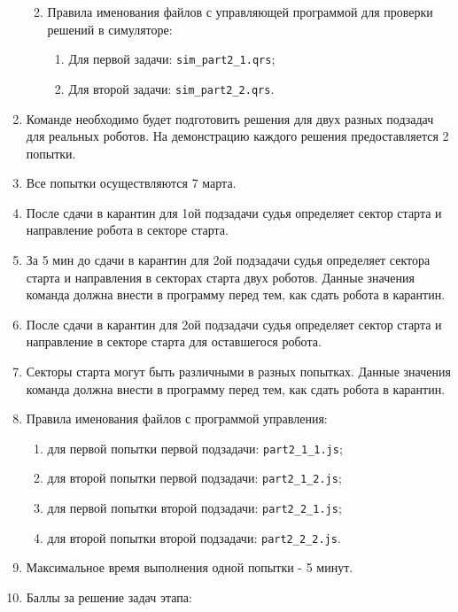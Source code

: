 \begin{enumerate}
\begin{enumerate}
\begin{enumerate}
        \end{enumerate}

        \item Правила именования файлов с управляющей программой для проверки решений в симуляторе:
        \begin{enumerate}
            \item Для первой задачи: \texttt{sim\_part2\_1.qrs};
            \item Для второй задачи: \texttt{sim\_part2\_2.qrs}.
        \end{enumerate}
    \end{enumerate}
    \item Команде необходимо будет подготовить решения для двух разных подзадач для реальных роботов.
            На демонстрацию каждого решения предоставляется 2 попытки.
    \item Все попытки осуществляются 7 марта.
    \item После сдачи в карантин для 1ой подзадачи судья определяет сектор старта
            и направление робота в секторе старта.
    \item За 5 мин до сдачи в карантин для 2ой подзадачи судья определяет сектора старта
        и направления в секторах старта двух роботов. Данные значения команда должна внести в программу перед тем,
        как сдать робота в карантин.
    \item После сдачи в карантин для 2ой подзадачи судья определяет сектор старта
        и направление в секторе старта для оставшегося  робота.
    \item Секторы старта могут быть различными в разных попытках.
    Данные значения команда должна внести в программу перед тем, как сдать робота в карантин.
    \item Правила именования файлов с программой управления:
    \begin{enumerate}
        \item для первой попытки первой подзадачи: \texttt{part2\_1\_1.js};
        \item для второй попытки первой подзадачи: \texttt{part2\_1\_2.js};
        \item для первой попытки второй подзадачи: \texttt{part2\_2\_1.js};
        \item для второй попытки второй подзадачи: \texttt{part2\_2\_2.js}.
    \end{enumerate}
    \item Максимальное время выполнения одной попытки - 5 минут.
    \item Баллы за решение задач этапа:

\end{enumerate}
